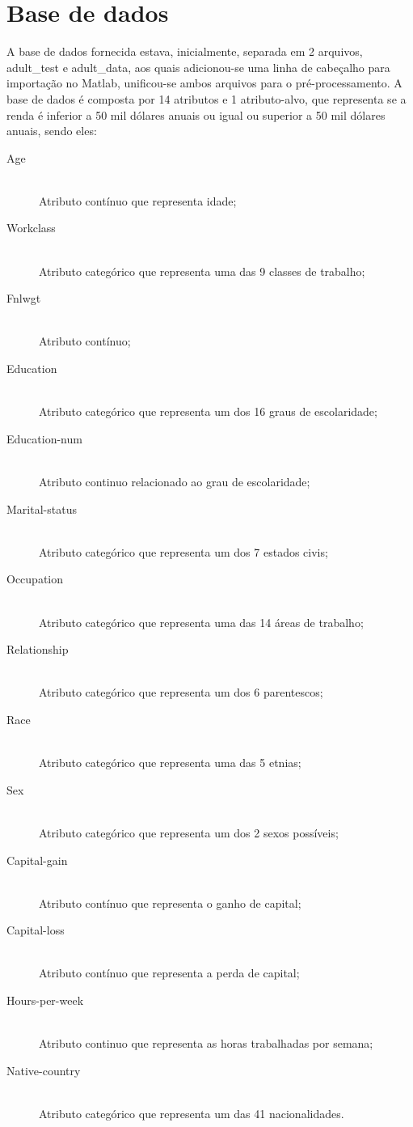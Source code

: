 \section{Base de dados}
A base de dados fornecida estava, inicialmente, separada em 2 arquivos, adult\_test e adult\_data, aos quais adicionou-se uma linha de cabeçalho para importação no Matlab, unificou-se ambos arquivos para o pré-processamento. A base de dados é composta por 14 atributos e 1 atributo-alvo, que representa se a renda é inferior a 50 mil dólares anuais ou igual ou superior a 50 mil dólares anuais, sendo eles:

\begin{description}
\item[Age] \hfill \\ Atributo contínuo que representa idade;
\item[Workclass] \hfill \\ Atributo categórico que representa uma das 9 classes de trabalho;
\item[Fnlwgt] \hfill \\ Atributo contínuo;
\item[Education] \hfill \\ Atributo categórico que representa um dos 16 graus de escolaridade;
\item[Education-num] \hfill \\ Atributo continuo relacionado ao grau de escolaridade;
\item[Marital-status] \hfill \\ Atributo categórico que representa um dos 7 estados civis;
\item[Occupation] \hfill \\ Atributo categórico que representa uma das 14 áreas de trabalho;
\item[Relationship] \hfill \\ Atributo categórico que representa um dos 6 parentescos;
\item[Race] \hfill \\ Atributo categórico que representa uma das 5 etnias;
\item[Sex] \hfill \\ Atributo categórico que representa um dos 2 sexos possíveis;
\item[Capital-gain] \hfill \\ Atributo contínuo que representa o ganho de capital;
\item[Capital-loss] \hfill \\ Atributo contínuo que representa a perda de capital;
\item[Hours-per-week] \hfill \\ Atributo continuo que representa as horas trabalhadas por semana;
\item[Native-country] \hfill \\ Atributo categórico que representa um das 41 nacionalidades.
\end{description}


